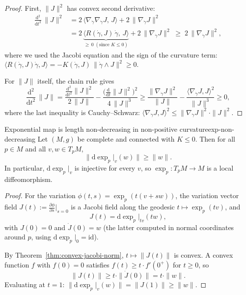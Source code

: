 \begin{proof}
First, $\|J\|^2$ has convex second derivative:
\begin{align*}
\frac{\mathrm{d}^2}{\mathrm{d}t^2}\,\|J\|^2 
&= 2\,\langle \nabla_{\dot\gamma}\nabla_{\dot\gamma} J,\, J\rangle + 2\,\|\nabla_{\dot\gamma} J\|^2 \\
&= 2\,\underbrace{\langle R(\dot\gamma, J)\,\dot\gamma,\, J\rangle}_{\geqslant\, 0\;(\text{since } K \leqslant 0)} + 2\,\|\nabla_{\dot\gamma} J\|^2 \;\geqslant\; 2\,\|\nabla_{\dot\gamma} J\|^2,
\end{align*}
where we used the Jacobi equation and the sign of the curvature term: $\langle R(\dot\gamma, J)\dot\gamma, J\rangle = -K(\dot\gamma, J)\,\|\dot\gamma \wedge J\|^2 \geqslant 0$.

For $\|J\|$ itself, the chain rule gives
\[
\frac{\mathrm{d}^2}{\mathrm{d}t^2}\,\|J\| = \frac{\frac{\mathrm{d}^2}{\mathrm{d}t^2}\|J\|^2}{2\,\|J\|} - \frac{\big(\frac{\mathrm{d}}{\mathrm{d}t}\|J\|^2\big)^2}{4\,\|J\|^3} \geqslant \frac{\|\nabla_{\dot\gamma} J\|^2}{\|J\|} - \frac{\langle \nabla_{\dot\gamma} J, J\rangle^2}{\|J\|^3} \geqslant 0,
\]
where the last inequality is Cauchy--Schwarz: $\langle \nabla_{\dot\gamma} J, J\rangle^2 \leqslant \|\nabla_{\dot\gamma} J\|^2 \cdot \|J\|^2$. \qedhere
\end{proof}


\begin{colortheo}{Exponential map is length non-decreasing in non-positive curvature}{exp-non-decreasing}
Let $(M, g)$ be complete and connected with $K \leqslant 0$. Then for all $p \in M$ and all $v, w \in T_p M$,
\[
\|\mathrm{d}\exp_p\big|_v(w)\| \geqslant \|w\|.
\]
In particular, $\mathrm{d}\exp_p|_v$ is injective for every $v$, so $\exp_p \colon T_p M \to M$ is a local diffeomorphism.
\end{colortheo}

\begin{proof}
For the variation $\phi(t, s) = \exp_p(t(v + sw))$, the variation vector field $J(t) := \frac{\partial \phi}{\partial s}\big|_{s = 0}$ is a Jacobi field along the geodesic $t \mapsto \exp_p(tv)$, and
\[
J(t) = \mathrm{d}\exp_p\big|_{tv}(tw),
\]
with $J(0) = 0$ and $\dot J(0) = w$ (the latter computed in normal coordinates around $p$, using $\mathrm{d}\exp_p|_0 = \mathrm{id}$).

By Theorem~\ref{thm:convex-jacobi-norm}, $t \mapsto \|J(t)\|$ is convex. A convex function $f$ with $f(0) = 0$ satisfies $f(t) \geqslant t \cdot f'(0^+)$ for $t \geqslant 0$, so
\[
\|J(t)\| \geqslant t \cdot \|\dot J(0)\| = t \cdot \|w\|.
\]
Evaluating at $t = 1$: $\|\mathrm{d}\exp_p\big|_v(w)\| = \|J(1)\| \geqslant \|w\|$.
\end{proof}

